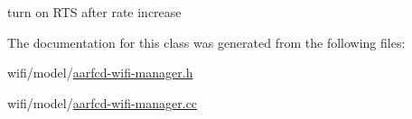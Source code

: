 turn on R\+TS after rate increase 



The documentation for this class was generated from the following files\+:\begin{DoxyCompactItemize}
\item 
wifi/model/\hyperlink{aarfcd-wifi-manager_8h}{aarfcd-\/wifi-\/manager.\+h}\item 
wifi/model/\hyperlink{aarfcd-wifi-manager_8cc}{aarfcd-\/wifi-\/manager.\+cc}\end{DoxyCompactItemize}
